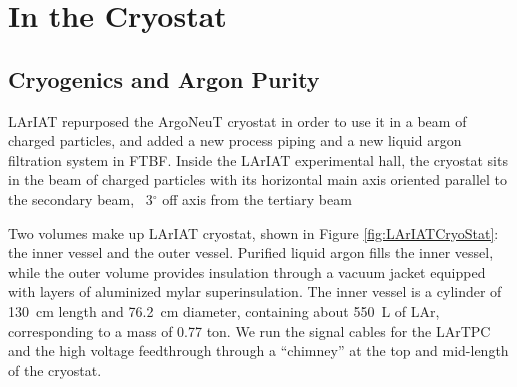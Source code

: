 \section{In the Cryostat}
\subsection{Cryogenics and Argon Purity}\label{ch:Cryo}
LArIAT repurposed the ArgoNeuT cryostat \cite{ArgoNeuT-det} in order to use it in a beam of charged particles, and added a new process piping and a new liquid argon filtration system in FTBF.  %
Inside the LArIAT experimental hall, the cryostat sits in the beam of charged particles with its horizontal main axis oriented parallel to the secondary beam, ~3$^\circ$ off axis from the tertiary beam

Two volumes make up LArIAT cryostat, shown in Figure \ref{fig:LArIATCryoStat}:  the inner vessel and the outer vessel. Purified liquid argon fills the inner vessel, while the outer volume provides insulation through a vacuum jacket equipped with layers of aluminized mylar superinsulation. The inner vessel is a cylinder of 130~cm length and 76.2~cm diameter, containing about 550~L of LAr, corresponding to a mass of 0.77 ton. We run the signal cables for the LArTPC and the high voltage feedthrough through a ``chimney'' at the top and mid-length of the cryostat.


